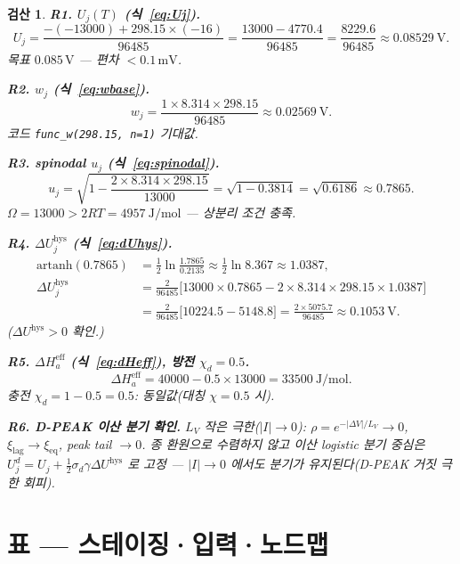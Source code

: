 \documentclass[11pt,a4paper]{article}
\newtheorem*{verifybox}{검산}
\newcommand{\eff}{\mathrm{eff}}
\newcommand{\eq}{\mathrm{eq}}
\newcommand{\hys}{\mathrm{hys}}
\newcommand{\lag}{\mathrm{lag}}
\newcommand{\code}[1]{\texttt{#1}}
\begin{document}
\begin{verifybox}
\textbf{R1. $U_j(T)$ (식~\eqref{eq:Uj}).}
\begin{equation*}
U_j = \frac{-(-13000)+298.15\times(-16)}{96485}
    = \frac{13000-4770.4}{96485}
    = \frac{8229.6}{96485}\approx0.08529\ \text{V}.
\end{equation*}
목표 $0.085\,\text{V}$ — 편차 $<0.1\,\text{mV}$. \checkmark

\textbf{R2. $w_j$ (식~\eqref{eq:wbase}).}
\begin{equation*}
w_j = \frac{1\times8.314\times298.15}{96485}\approx0.02569\ \text{V}.
\end{equation*}
코드 \code{func\_w(298.15, n=1)} 기대값. \checkmark

\textbf{R3. spinodal $u_j$ (식~\eqref{eq:spinodal}).}
\begin{equation*}
u_j=\sqrt{1-\frac{2\times8.314\times298.15}{13000}}=\sqrt{1-0.3814}=\sqrt{0.6186}\approx0.7865.
\end{equation*}
$\Omega=13000>2RT=4957\ \text{J/mol}$ — 상분리 조건 충족. \checkmark

\textbf{R4. $\Delta U_j^\hys$ (식~\eqref{eq:dUhys}).}
\begin{align*}
\mathrm{artanh}(0.7865)&=\tfrac12\ln\tfrac{1.7865}{0.2135}\approx\tfrac12\ln8.367\approx1.0387,\\
\Delta U_j^\hys &= \frac{2}{96485}\big[13000\times0.7865 - 2\times8.314\times298.15\times1.0387\big]\\
&=\frac{2}{96485}\big[10224.5-5148.8\big]=\frac{2\times5075.7}{96485}\approx0.1053\ \text{V}.
\end{align*}
\checkmark ($\Delta U^\hys>0$ 확인.)

\textbf{R5. $\Delta H_a^\eff$ (식~\eqref{eq:dHeff}), 방전 $\chi_d=0.5$.}
\begin{equation*}
\Delta H_a^\eff = 40000 - 0.5\times13000 = 33500\ \text{J/mol}.
\end{equation*}
충전 $\chi_d=1-0.5=0.5$: 동일값(대칭 $\chi=0.5$ 시). \checkmark

\textbf{R6. D-PEAK 이산 분기 확인.} $L_V$ 작은 극한($|I|\to0$): $\rho=e^{-|\Delta V|/L_V}\to0$,
$\xi_\lag\to\xi_\eq$, peak tail $\to0$. 종 환원으로 수렴하지 않고 이산 logistic 분기 중심은 $U_j^d=U_j+\tfrac12\sigma_d\gamma\Delta U^\hys$ 로 고정 — $|I|\to0$ 에서도 분기가 유지된다(D-PEAK 거짓 극한 회피). \checkmark
\end{verifybox}

\section{표 — 스테이징·입력·노드맵}\label{sec:tables}
\end{document}
